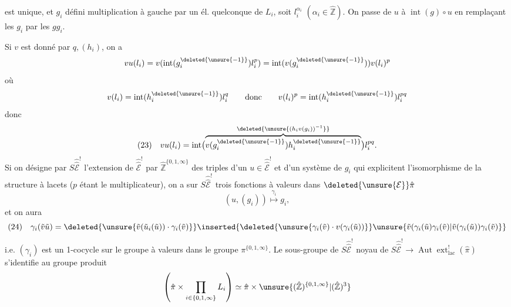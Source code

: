 est unique, et $g_i$ défini  multiplication à gauche par un él. quelconque de $L_i$, soit $l_i^{\alpha_i}$ $(\alpha_i\in\hat{\mathbb Z})$. On passe de $u$ à $\operatorname{int}(g)\circ u$ en  remplaçant les $g_i$ par les $gg_i$.

Si $v$ est donné par $q,(h_i)$, on a
\[
vu(l_i)=v(\operatorname{int}(g_i^{\deleted{\unsure{-1}}})l_i^p)
=\operatorname{int}(v(g_i^{\deleted{\unsure{-1}}}))v(l_i)^p
\]
où
\[
v(l_i)=\operatorname{int}(h_i^{\deleted{\unsure{-1}}})l_i^q
\qquad\text{donc}\qquad v(l_i)^p=\operatorname{int}(h_i^{\deleted{\unsure{-1}}})l_i^{pq}
\]
donc
\[
(23)\quad vu(l_i)=\operatorname{int}\bigl(
\overbrace{v(g_i^{\deleted{\unsure{-1}}})h_i^{\deleted{\unsure{-1}}}}^{\deleted{\unsure{(h_i v(g_i))^{-1}}}}
\bigr)l_i^{pq}.
\]
Si on désigne par $S\widehat{\widehat{\mathcal E}}^!$ l'extension de $\widehat{\widehat{\mathcal E}}^!$ par $\hat{\mathbb Z}^{\{0,1,\infty\}}$   des  triples d'un $u\in\widehat{\widehat{\mathcal E}}^!$ et d'un système de $g_i$ qui explicitent  l'isomorphisme de la structure à lacets ($p$ étant le multiplicateur), on a sur $S\widehat{\widehat{\mathcal E}}^!$ trois fonctions à valeurs dans $\deleted{\unsure{\mathcal E}}\hat\pi$
\[
(u,(g_i))\overset{\gamma_i}{\longmapsto}g_i,
\]
et on aura
\[
(24)\quad\gamma_i(\tilde v\tilde u)
=\deleted{\unsure{\tilde v(\tilde u_i(\tilde u))\cdot\gamma_i(\tilde v)}}
\inserted{\deleted{\unsure{\gamma_i(\tilde v)\cdot v(\gamma_i(\tilde u))}}
\unsure{\tilde v(\gamma_i(\tilde u)\gamma_i(\tilde v)|\tilde v(\gamma_i(\tilde u))\gamma_i(\tilde v)}}
\]
i.e. $(\gamma_i)$ est un 1-cocycle sur le groupe  à valeurs dans le groupe  $\pi^{\{0,1,\infty\}}$.
Le sous-groupe de $S\widehat{\widehat{\mathcal E}}^!$ noyau de $S\widehat{\widehat{\mathcal E}}^!\longrightarrow\operatorname{Aut}\operatorname{ext}_{\mathrm{lac}}^!(\hat\pi)$ s'identifie au groupe produit
\[
\left(\hat\pi\times\prod_{i\in\{0,1,\infty\}}L_i\right)
\simeq\hat\pi\times\unsure{(\hat{\mathbb Z})^{\{0,1,\infty\}}|(\hat{\mathbb Z})^3}
\]

